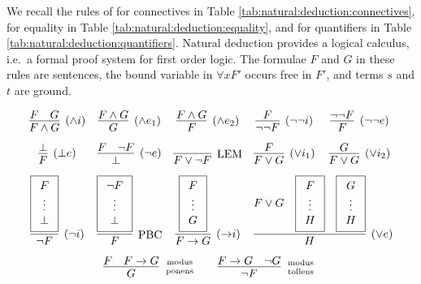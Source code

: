 
\begin{definition}\label{def:natural:deduction}
	We recall the rules of  for connectives
	in Table \ref{tab:natural:deduction:connectives},
	for equality in Table \ref{tab:natural:deduction:equality},
	and for quantifiers in Table \ref{tab:natural:deduction:quantifiers}.
	Natural deduction provides a logical calculus,
	i.e.~a formal proof system for first order logic.
	The formulae $F$ and $G$ in these rules are sentences,
	the bound variable in  $\forall x F'$ occurs free in $F'$,
	and terms $s$ and $t$ are ground.

\begin{table}[hbt]
\begin{gather*}
\begin{array}{ccccc}
\infer[(\land i)]{F\land G}{F & G}
&
\infer[(\land e_1)]{G}{F \land G}
&
\infer[(\land e_2)]{F}{F \land G}
&
\infer[(\lnot\lnot i)]{\lnot\lnot F}{F}
&
\infer[(\lnot\lnot e)]{F}{\lnot\lnot F}
\\[0.7em]
\infer[(\bot e)]{F}{\bot}
&
\infer[(\lnot e)]{\bot}{F & \lnot F}
&
\infer[\text{LEM}]{F\lor\lnot F}{}
&
\infer[(\lor i_1)]{F\lor G}{F}
&
\infer[(\lor i_2)]{F\lor G}{G}
\\[0.7em]
\infer[(\lnot i)]{\lnot F}{
	\boxed{\begin{array}{c}F\\\vdots\\\bot\end{array}}}
&
\infer[\text{PBC}]{F}{
	\boxed{\begin{array}{c}\lnot F\\\vdots\\\bot\end{array}}}
&
\infer[({\limp} i)]{F\limp G}{
	\boxed{\begin{array}{c}F\\\vdots\\G\end{array}
}}
&
\multicolumn{2}{l}{
	\infer[(\lor e)]{H}{
		F\lor G &
		\boxed{\begin{array}{c}F\\\vdots\\H\end{array}} &
		\boxed{\begin{array}{c}G\\\vdots\\H\end{array}}
	}
}
\\[0.7em]
&
\multicolumn{3}{r}{
\infer[\text{modus}\atop\text{ponens}]{G}{F & F\limp G}
\qquad
\infer[\text{modus}\atop\text{tollens}]{\lnot F}{F\limp G & \lnot G}
}
&
\end{array}
\end{gather*}
\caption{Natural Deduction Rules for Connectives}
\label{tab:natural:deduction:connectives}
\end{table}


\end{definition}
